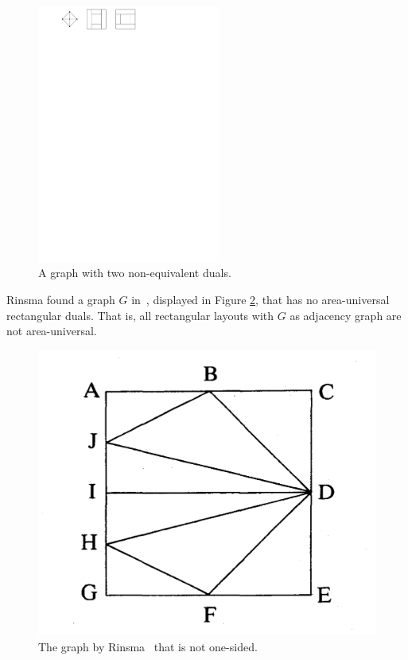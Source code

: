   \begin{figure}
    \centering
    \includegraphics[width=6cm]{introduction/img/nonuniqueRectDual.pdf}
    \caption{A graph with two non-equivalent duals.}
    \label{fig:intro:nonuniqueRectDual}
  \end{figure}

  Rinsma found a graph $G$ in~\cite{Rinsma1987}, displayed in Figure \ref{fig:intro:rinsma}, that has no area-universal rectangular duals.
  That is, all rectangular layouts with $G$ as adjacency graph are not area-universal.

  \begin{figure}  %
    \includegraphics[scale=.15]{introduction/img/rinsma.png}
    \caption{The graph by Rinsma~\cite{Rinsma1987} that is not one-sided.}
    \label{fig:intro:rinsma}
  \end{figure}

